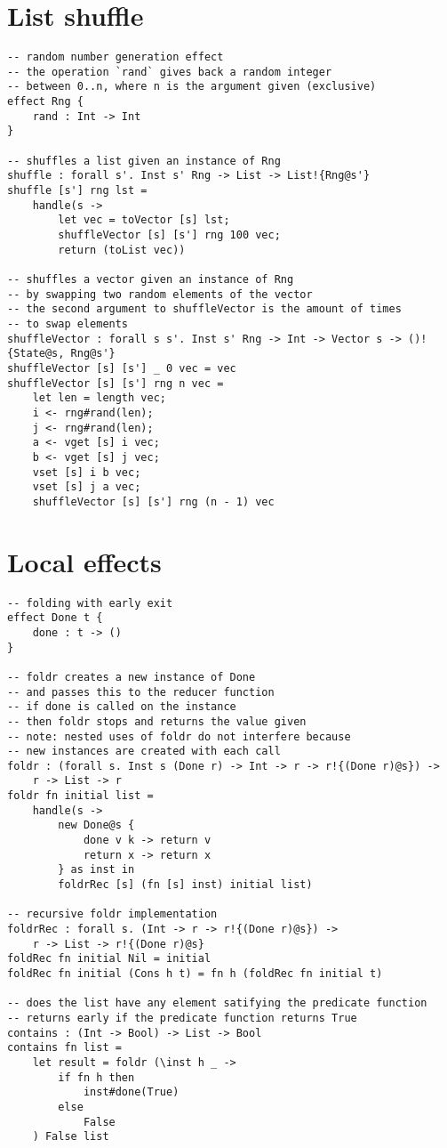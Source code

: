 \section{List shuffle}
\begin{verbatim}
-- random number generation effect
-- the operation `rand` gives back a random integer
-- between 0..n, where n is the argument given (exclusive)
effect Rng {
	rand : Int -> Int
}

-- shuffles a list given an instance of Rng
shuffle : forall s'. Inst s' Rng -> List -> List!{Rng@s'}
shuffle [s'] rng lst =
	handle(s ->
		let vec = toVector [s] lst;
		shuffleVector [s] [s'] rng 100 vec;
		return (toList vec))

-- shuffles a vector given an instance of Rng
-- by swapping two random elements of the vector
-- the second argument to shuffleVector is the amount of times
-- to swap elements
shuffleVector : forall s s'. Inst s' Rng -> Int -> Vector s -> ()!{State@s, Rng@s'}
shuffleVector [s] [s'] _ 0 vec = vec
shuffleVector [s] [s'] rng n vec =
	let len = length vec;
	i <- rng#rand(len);
	j <- rng#rand(len);
	a <- vget [s] i vec;
	b <- vget [s] j vec;
	vset [s] i b vec;
	vset [s] j a vec;
	shuffleVector [s] [s'] rng (n - 1) vec
\end{verbatim}

\section{Local effects}
\begin{verbatim}
-- folding with early exit
effect Done t {
	done : t -> ()
}

-- foldr creates a new instance of Done
-- and passes this to the reducer function
-- if done is called on the instance
-- then foldr stops and returns the value given
-- note: nested uses of foldr do not interfere because
-- new instances are created with each call
foldr : (forall s. Inst s (Done r) -> Int -> r -> r!{(Done r)@s}) ->
	r -> List -> r
foldr fn initial list =
	handle(s ->
		new Done@s {
			done v k -> return v
			return x -> return x
		} as inst in
		foldrRec [s] (fn [s] inst) initial list)

-- recursive foldr implementation
foldrRec : forall s. (Int -> r -> r!{(Done r)@s}) ->
	r -> List -> r!{(Done r)@s}
foldRec fn initial Nil = initial
foldRec fn initial (Cons h t) = fn h (foldRec fn initial t)

-- does the list have any element satifying the predicate function
-- returns early if the predicate function returns True
contains : (Int -> Bool) -> List -> Bool
contains fn list =
	let result = foldr (\inst h _ ->
		if fn h then
			inst#done(True)
		else
			False
	) False list
\end{verbatim}

